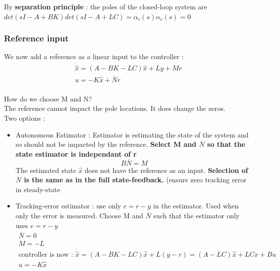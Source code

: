 \documentclass[../main.tex]{subfiles}
\begin{document}
By \textbf{separation principle} : the poles of the closed-loop system are $det(sI-A+BK)det(sI-A+LC) = \alpha_c(s) \alpha_e(s) = 0$\\

\subsubsection{Reference input}
We now add a reference as a linear input to the controller : \begin{equation}
    \begin{gathered}
        \dot{\hat{x}} = (A-BK-LC)\hat{x} + Ly + Mr\\
        u = -K\hat{x} + \overline{N}r\\
    \end{gathered}
\end{equation}

How do we choose M and N?\\
\warning The reference cannot impact the pole locations. It does change the zeros.\\

Two options : \begin{itemize}
    \item Autonomous Estimator : Estimator is estimating the state of the system and so should not be impacted by the reference. \textbf{Select M and $\overline{N}$ so that the state estimator is independant of r} \begin{equation}
        B\overline{N} = M
    \end{equation}
    The estimated state $\hat{x}$ does not have the reference as an input. \textbf{Selection of $\overline{N}$ is the same as in the full state-feedback.} (ensure zero tracking error in steady-state\\
    \item Tracking-error estimator : use only $e=r-y$ in the estimator. Used when only the error is measured. Choose M and $\overline{N}$ such that the estimator only uses $e=r-y$ \begin{equation}\begin{gathered}
        \overline{N} = 0\\
        M = -L\\
        \text{controller is now : } \dot{\hat{x}} = (A-BK-LC)\hat{x} + L(y-r) = (A-LC)\hat{x} + LCx +Bu\\
        u=-K\hat{x}\\
        \end{gathered}
    \end{equation}
\end{itemize}
\end{document}
